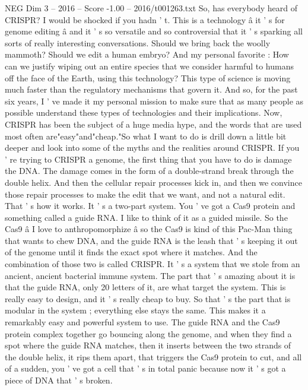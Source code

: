 \begin{textsample}{NEG Dim 3 – 2016 – Score -1.00 – 2016/t001263.txt}  \label{ex:f3_neg_074}
So, has everybody heard of CRISPR?
I would be shocked if you hadn ' t.
This is a technology â it ' s for genome editing â and it ' s so versatile and so controversial that it ' s sparking all sorts of really interesting conversations.
Should we bring back the woolly mammoth?
Should we edit a human embryo?
And my personal favorite : How can we justify wiping out an entire species that we consider harmful to humans off the face of the Earth, using this technology?
This type of science is moving much faster than the regulatory mechanisms that govern it.
And so, for the past six years, I ' ve made it my personal mission to make sure that as many people as possible understand these types of technologies and their implications.
Now, CRISPR has been the subject of a huge media hype, and the words that are used most often are"easy"and"cheap."So what I want to do is drill down a little bit deeper and look into some of the myths and the realities around CRISPR.
If you ' re trying to CRISPR a genome, the first thing that you have to do is damage the DNA.
The damage comes in the form of a double-strand break through the double helix.
And then the cellular repair processes kick in, and then we convince those repair processes to make the edit that we want, and not a natural edit.
That ' s how it works.
It ' s a two-part system.
You ' ve got a Cas9 protein and something called a guide RNA.
I like to think of it as a guided missile.
So the Cas9 â I love to anthropomorphize â so the Cas9 is kind of this Pac-Man thing that wants to chew DNA, and the guide RNA is the leash that ' s keeping it out of the genome until it finds the exact spot where it matches.
And the combination of those two is called CRISPR.
It ' s a system that we stole from an ancient, ancient bacterial immune system.
The part that ' s amazing about it is that the guide RNA, only 20 letters of it, are what target the system.
This is really easy to design, and it ' s really cheap to buy.
So that ' s the part that is modular in the system ; everything else stays the same.
This makes it a remarkably easy and powerful system to use.
The guide RNA and the Cas9 protein complex together go bouncing along the genome, and when they find a spot where the guide RNA matches, then it inserts between the two strands of the double helix, it rips them apart, that triggers the Cas9 protein to cut, and all of a sudden, you ' ve got a cell that ' s in total panic because now it ' s got a piece of DNA that ' s broken.

\end{textsample}
